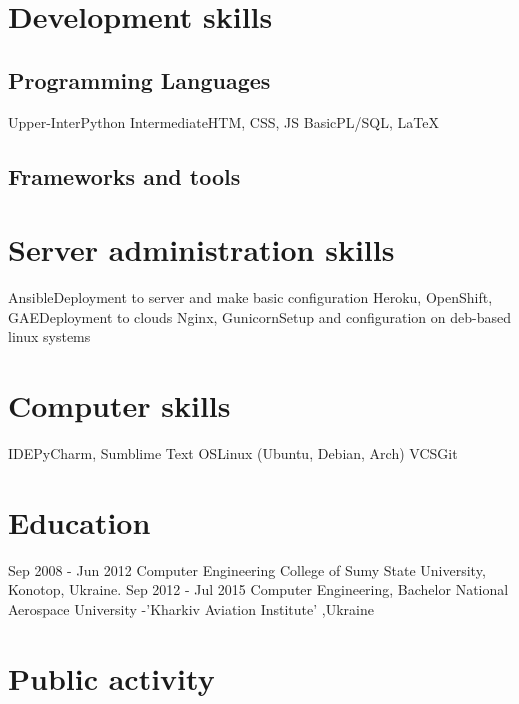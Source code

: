 \documentclass[11pt,a4paper]{moderncv}
\begin{document}
	
	
	\section{Development skills}
	\subsection{Programming Languages}
	\cvline
	{Upper-Inter}{Python}
	\cvline
	{Intermediate}{HTM, CSS, JS}
	\cvline
	{Basic}{PL/SQL, LaTeX}
	\subsection{Frameworks and tools}
	
	\section{Server administration skills}
	\cvline
	{Ansible}{Deployment to server and make basic configuration}
	\cvline
	{Heroku, OpenShift, GAE}{Deployment to clouds}
	\cvline
	{Nginx, Gunicorn}{Setup and configuration on deb-based linux systems}
	
	\section{Computer skills}
	\cvline
	{IDE}{PyCharm, Sumblime Text}
	\cvline
	{OS}{Linux (Ubuntu, Debian, Arch)}
	\cvline
	{VCS}{Git}
	
	
	\section{Education}
	\cventry
	{Sep 2008 - Jun 2012}
	{Computer Engineering}
	{College of Sumy State University, Konotop, Ukraine.}
	{}{}{}
	\cventry
	{Sep 2012 - Jul 2015}
	{Computer Engineering, Bachelor}
	{National Aerospace University -'Kharkiv Aviation Institute' ,Ukraine}
	{}{}{}
	
	\section{Public activity}
	
\end{document}
